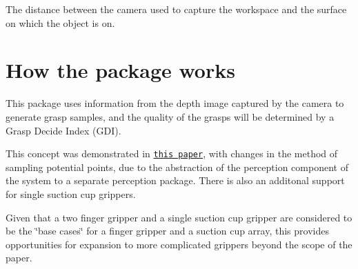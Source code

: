 The distance between the camera used to capture the workspace and the surface on which the object is on. 



\section*{How the package works}

This package uses information from the depth image captured by the camera to generate grasp samples, and the quality of the grasps will be determined by a Grasp Decide Index (G\+DI).

This concept was demonstrated in \href{https://arxiv.org/pdf/2001.05856.pdf}{\tt this paper}, with changes in the method of sampling potential points, due to the abstraction of the perception component of the system to a separate perception package. There is also an additonal support for single suction cup grippers.

Given that a two finger gripper and a single suction cup gripper are considered to be the \char`\"{}base cases\char`\"{} for a finger gripper and a suction cup array, this provides opportunities for expansion to more complicated grippers beyond the scope of the paper. 